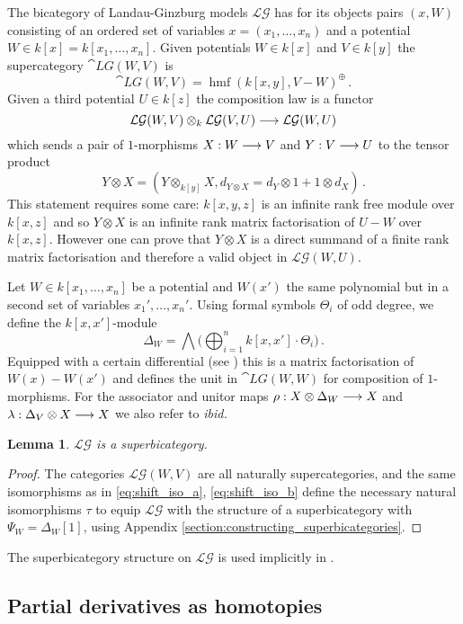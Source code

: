 \documentclass[english,letter paper,12pt,leqno]{article}
\newtheorem{lemma}[theorem]{Lemma}
\theoremstyle{example}
\numberwithin{equation}{section}
\def\LG{\mathcal{LG}}
\DeclareMathOperator{\hmf}{hmf}
\begin{document}
The bicategory of Landau-Ginzburg models $\LG$ has for its objects pairs $(x,W)$ consisting of an ordered set of variables $x = (x_1,\ldots,x_n)$ and a potential $W \in k[x] = k[x_1,\ldots,x_n]$. Given potentials $W \in k[x]$ and $V \in k[y]$ the supercategory $\cat{LG}(W,V)$ is
\[
\cat{LG}(W,V) = \hmf(k[x,y], V - W)^{\oplus}\,.
\]
Given a third potential $U \in k[z]$ the composition law is a functor
\[
\LG(W,V) \otimes_k \LG(V, U) \lto \LG(W, U)
\]
which sends a pair of $1$-morphisms $X: W \longrightarrow V$ and $Y: V \longrightarrow U$ to the tensor product
\begin{equation}\label{eq:tensor_comp}
Y \otimes X = ( Y \otimes_{k[y]} X, d_{Y \otimes X} = d_Y \otimes 1 + 1 \otimes d_X )\,.
\end{equation}
This statement requires some care: $k[x,y,z]$ is an infinite rank free module over $k[x,z]$ and so $Y \otimes X$ is an infinite rank matrix factorisation of $U - W$ over $k[x,z]$. However one can prove that $Y \otimes X$ is a direct summand of a finite rank matrix factorisation \cite{dm1102.2957} and therefore a valid object in $\LG(W,U)$.

Let $W \in k[x_1,\ldots,x_n]$ be a potential and $W(x')$ the same polynomial but in a second set of variables $x_1',\ldots,x_n'$. Using formal symbols $\Theta_i$ of odd degree, we define the $k[x,x']$-module
\[
\Delta_W = \bigwedge \big( \bigoplus_{i=1}^n k[x,x'] \cdot \Theta_i \big)\,.
\]
Equipped with a certain differential (see \cite{lgdual}) this is a matrix factorisation of $W(x) - W(x')$ and defines the unit in $\cat{LG}(W,W)$ for composition of $1$-morphisms. For the associator and unitor maps $\rho: X \otimes \Delta_W \longrightarrow X$ and $\lambda: \Delta_V \otimes X \longrightarrow X$ we also refer to \emph{ibid.}

\begin{lemma} $\LG$ is a superbicategory.
\end{lemma}
\begin{proof}
The categories $\LG(W,V)$ are all naturally supercategories, and the same isomorphisms as in \eqref{eq:shift_iso_a}, \eqref{eq:shift_iso_b} define the necessary natural isomorphisms $\tau$ to equip $\LG$ with the structure of a superbicategory with $\Psi_W = \Delta_W[1]$, using Appendix \ref{section:constructing_superbicategories}.
\end{proof}

The superbicategory structure on $\LG$ is used implicitly in \cite[Section 7]{lgdual}.

\subsection{Partial derivatives as homotopies}\label{section:partial}
\end{document}
